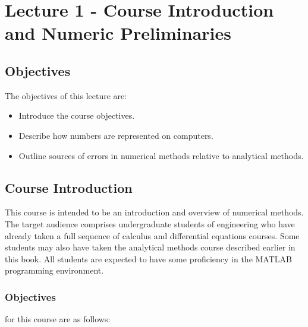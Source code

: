 \chapter{Lecture 1 - Course Introduction and Numeric Preliminaries}
\label{ch:lec1n}
\section{Objectives}
The objectives of this lecture are:
\begin{itemize}
\item Introduce the course objectives.
\item Describe how numbers are represented on computers.
\item Outline sources of errors in numerical methods relative to analytical methods.
\end{itemize}
\setcounter{lstannotation}{0}

\section{Course Introduction}

This course is intended to be an introduction and overview of numerical methods.  The target audience comprises undergraduate students of engineering who have already taken a full sequence of calculus and differential equations courses.  Some students may also have taken the analytical methods course described earlier in this book. All students are expected to have some proficiency in the MATLAB programming environment.  

\subsection{Objectives}
 for this course are as follows:


